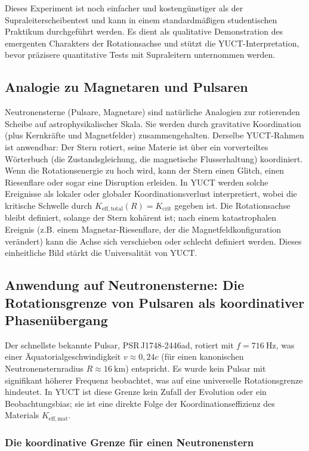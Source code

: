 \documentclass[12pt,a4paper]{article}
\newcommand{\Kefftot}{K_{\mathrm{eff,total}}}
\newcommand{\Kcrit}{K_{\mathrm{crit}}}
\begin{document}
	Dieses Experiment ist noch einfacher und kostengünstiger als der Supraleiterscheibentest und kann in einem standardmäßigen studentischen Praktikum durchgeführt werden. Es dient als qualitative Demonstration des emergenten Charakters der Rotationsachse und stützt die YUCT-Interpretation, bevor präzisere quantitative Tests mit Supraleitern unternommen werden.
	
	\subsection{Analogie zu Magnetaren und Pulsaren}
	
	Neutronensterne (Pulsare, Magnetare) sind natürliche Analogien zur rotierenden Scheibe auf astrophysikalischer Skala. Sie werden durch gravitative Koordination (plus Kernkräfte und Magnetfelder) zusammengehalten. Derselbe YUCT-Rahmen ist anwendbar: Der Stern rotiert, seine Materie ist über ein vorverteiltes Wörterbuch (die Zustandsgleichung, die magnetische Flusserhaltung) koordiniert. Wenn die Rotationsenergie zu hoch wird, kann der Stern einen Glitch, einen Riesenflare oder sogar eine Disruption erleiden. In YUCT werden solche Ereignisse als lokaler oder globaler Koordinationsverlust interpretiert, wobei die kritische Schwelle durch \(\Kefftot(R) = \Kcrit\) gegeben ist. Die Rotationsachse bleibt definiert, solange der Stern kohärent ist; nach einem katastrophalen Ereignis (z.B. einem Magnetar-Riesenflare, der die Magnetfeldkonfiguration verändert) kann die Achse sich verschieben oder schlecht definiert werden. Dieses einheitliche Bild stärkt die Universalität von YUCT.
	
	\subsection{Anwendung auf Neutronensterne: Die Rotationsgrenze von Pulsaren als koordinativer Phasenübergang}
	
	Der schnellste bekannte Pulsar, PSR J1748‑2446ad, rotiert mit \(f = 716\ \text{Hz}\), was einer Äquatorialgeschwindigkeit \(v \approx 0,24c\) (für einen kanonischen Neutronensternradius \(R\approx 16\ \text{km}\)) entspricht. Es wurde kein Pulsar mit signifikant höherer Frequenz beobachtet, was auf eine universelle Rotationsgrenze hindeutet. In YUCT ist diese Grenze kein Zufall der Evolution oder ein Beobachtungsbias; sie ist eine direkte Folge der Koordinationseffizienz des Materials \(K_{\mathrm{eff,mat}}\).
	
	\subsubsection{Die koordinative Grenze für einen Neutronenstern}
	
\end{document}

